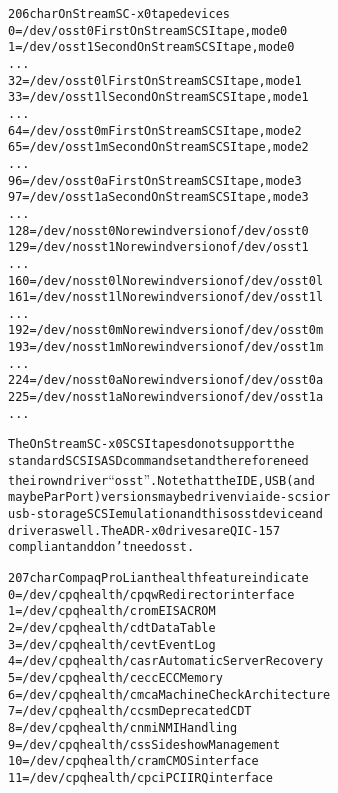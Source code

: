 \documentclass[a4paper,8pt,english]{sphinxmanual}
\begin{document}
\begin{alltt}
 206 char       OnStream SC-x0 tape devices
                  0 = /dev/osst0                First OnStream SCSI tape, mode 0
                  1 = /dev/osst1                Second OnStream SCSI tape, mode 0
                    ...
                 32 = /dev/osst0l               First OnStream SCSI tape, mode 1
                 33 = /dev/osst1l               Second OnStream SCSI tape, mode 1
                    ...
                 64 = /dev/osst0m               First OnStream SCSI tape, mode 2
                 65 = /dev/osst1m               Second OnStream SCSI tape, mode 2
                    ...
                 96 = /dev/osst0a               First OnStream SCSI tape, mode 3
                 97 = /dev/osst1a               Second OnStream SCSI tape, mode 3
                    ...
                128 = /dev/nosst0               No rewind version of /dev/osst0
                129 = /dev/nosst1               No rewind version of /dev/osst1
                    ...
                160 = /dev/nosst0l              No rewind version of /dev/osst0l
                161 = /dev/nosst1l              No rewind version of /dev/osst1l
                    ...
                192 = /dev/nosst0m              No rewind version of /dev/osst0m
                193 = /dev/nosst1m              No rewind version of /dev/osst1m
                    ...
                224 = /dev/nosst0a              No rewind version of /dev/osst0a
                225 = /dev/nosst1a              No rewind version of /dev/osst1a
                    ...

                The OnStream SC-x0 SCSI tapes do not support the
                standard SCSI SASD command set and therefore need
                their own driver ``osst''. Note that the IDE, USB (and
                maybe ParPort) versions may be driven via ide-scsi or
                usb-storage SCSI emulation and this osst device and
                driver as well.  The ADR-x0 drives are QIC-157
                compliant and don't need osst.

 207 char       Compaq ProLiant health feature indicate
                  0 = /dev/cpqhealth/cpqw       Redirector interface
                  1 = /dev/cpqhealth/crom       EISA CROM
                  2 = /dev/cpqhealth/cdt        Data Table
                  3 = /dev/cpqhealth/cevt       Event Log
                  4 = /dev/cpqhealth/casr       Automatic Server Recovery
                  5 = /dev/cpqhealth/cecc       ECC Memory
                  6 = /dev/cpqhealth/cmca       Machine Check Architecture
                  7 = /dev/cpqhealth/ccsm       Deprecated CDT
                  8 = /dev/cpqhealth/cnmi       NMI Handling
                  9 = /dev/cpqhealth/css        Sideshow Management
                 10 = /dev/cpqhealth/cram       CMOS interface
                 11 = /dev/cpqhealth/cpci       PCI IRQ interface


\end{alltt}
\end{document}
